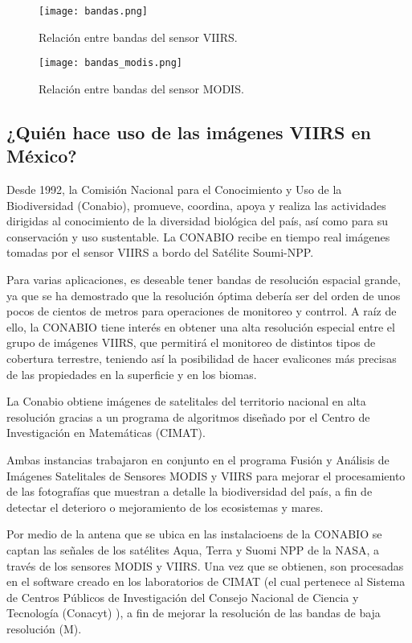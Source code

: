 \begin{figure}[ht!]
\centering
\texttt{[image: bandas.png]}
\caption{Relación entre bandas del sensor VIIRS.} \label{bandas_viirs}
\end{figure}

\begin{figure}[ht!]

\centering
\texttt{[image: bandas\_modis.png]}
\caption{Relación entre bandas del sensor MODIS.} \label{bandas_modis}
\end{figure}

\subsection{¿Quién hace uso de las imágenes VIIRS en México?}

Desde 1992, la Comisión Nacional para el Conocimiento y Uso de la Biodiversidad (Conabio), promueve, coordina, apoya y realiza las actividades dirigidas al conocimiento de la diversidad biológica del país, así como para su conservación y uso sustentable. La CONABIO recibe en tiempo real imágenes tomadas por el sensor VIIRS a bordo del Satélite Soumi-NPP. 

Para varias aplicaciones, es deseable tener bandas de resolución espacial grande, ya que se ha demostrado que la resolución óptima debería ser del orden de unos pocos de cientos de metros para operaciones de monitoreo y contrrol. A raíz de ello, la CONABIO tiene interés en obtener una alta resolución especial entre el grupo de imágenes VIIRS, que permitirá el monitoreo de distintos tipos de cobertura terrestre, teniendo así la posibilidad de hacer evalicones más precisas de las propiedades en la superficie y en los biomas. 

La Conabio obtiene imágenes de satelitales del territorio nacional en alta resolución gracias a un programa de algoritmos diseñado por el Centro de Investigación en Matemáticas (CIMAT).

Ambas instancias trabajaron en conjunto en el programa Fusión y Análisis de Imágenes Satelitales de Sensores MODIS y VIIRS para mejorar el procesamiento de las fotografías que muestran a detalle la biodiversidad del país, a fin de detectar el deterioro o mejoramiento de los ecosistemas y mares. 

Por medio de la antena que se ubica en las instalacioens de la CONABIO se captan las señales de los satélites Aqua, Terra y Suomi NPP de la NASA, a través de los sensores MODIS y VIIRS. Una vez que se obtienen, son procesadas en el software creado en los laboratorios de CIMAT (el cual pertenece al Sistema de Centros Públicos de Investigación del Consejo Nacional de Ciencia y Tecnología (Conacyt) ), a fin de mejorar la resolución de las bandas de baja resolución (M).


